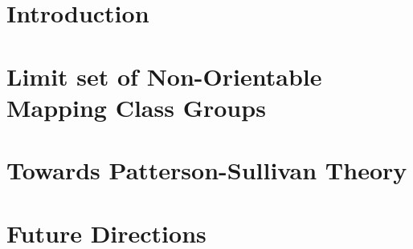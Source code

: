 \documentclass[leqno, 12pt]{report} %
\numberwithin{equation}{section}
\numberwithin{theorem}{chapter}        %
\begin{document}





\chapter{Introduction}
\label{chap:introduction}
\setcounter{page}{1} %



% 

\chapter{Limit set of Non-Orientable Mapping Class Groups}
\label{chap:limit-set-paper}

% 





\chapter{Towards Patterson-Sullivan Theory}
\label{chap:stat-convex-cocompact}

% 







\chapter{Future Directions}
\label{chap:future-directions}


\newpage
{}
% 
\appto{\bibsetup}{\raggedright}
\printbibliography
\end{document}
